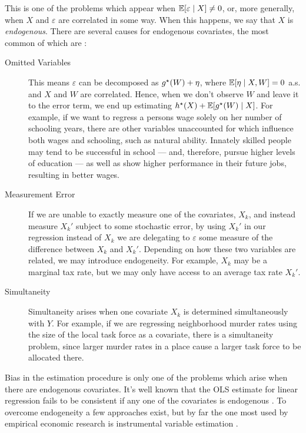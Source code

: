 This is one of the problems which appear when $ \mathbb{E} [ \varepsilon \mid X ] \neq 0 $, or, more generally, when $ X $ and $ \varepsilon $ are correlated in some way.
When this happens, we say that $ X $ is \emph{endogenous}.
There are several causes for endogenous covariates, the most common of  which are \cite{wooldridge2001}:
\begin{description}
    \item[Omitted Variables] This means $ \varepsilon $ can be decomposed as $ g^{ \star } ( W ) + \eta $, where $ \mathbb{E} [ \eta \mid X, W ] = 0 $ a.s. and $ X $ and $ W $ are correlated.
        Hence, when we don't observe $ W $ and leave it to the error term, we end up estimating $ h^{ \star } ( X ) + \mathbb{E} [ g^{ \star } ( W ) \mid X ] $.
        For example, if we want to regress a persons wage solely on her number of schooling years, there are other variables unaccounted for which influence both wages and schooling, such as natural ability.
        Innately skilled people may tend to be successful in school --- and, therefore, pursue higher levels of education --- as well as show higher performance in their future jobs, resulting in better wages.
    \item[Measurement Error] If we are unable to exactly measure one of the covariates, $ X_{ k } $, and instead measure $ X_{ k }' $ subject to some stochastic error, by using $ X_{ k }' $ in our regression instead of $ X_{ k } $ we are delegating to $ \varepsilon $ some measure of the difference between $ X_{ k } $ and $ X_{ k }' $.
        Depending on how these two variables are related, we may introduce endogeneity.
        For example, $ X_{ k } $ may be a marginal tax rate, but we may only have access to an average tax rate $ X_{ k }' $.
    \item[Simultaneity] Simultaneity arises when one covariate $ X_{ k } $ is determined simultaneously with $ Y $.
        For example, if we are regressing neighborhood murder rates using the size of the local task force as a covariate, there is a simultaneity problem, since larger murder rates in a place cause a larger task force to be allocated there.
\end{description}

Bias in the estimation procedure is only one of the problems which arise when there are endogenous covariates.
It's well known that the OLS estimate for linear regression fails to be consistent if any one of the covariates is endogenous \cite{wooldridge2001}.
To overcome endogeneity a few approaches exist, but by far the one most used by empirical economic research is instrumental variable estimation \cite{wooldridge2001}.

